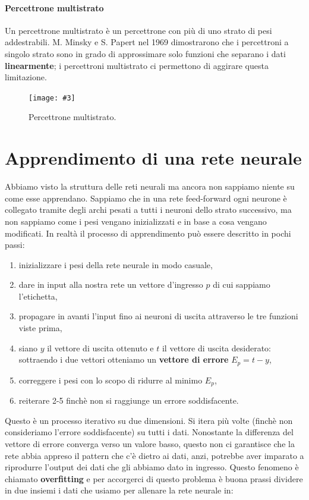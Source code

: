 \documentclass[12pt, twoside, letterpaper]{report}
\newcommand{\img}[4] {
	\begin{figure}
		\centering
		\texttt{[image: \#3]}\\
		\caption{#1}
		\label{fig:#4}
	\end{figure}
}
\begin{document}
			\paragraph{Percettrone multistrato} Un percettrone multistrato è un percettrone con più di uno strato di pesi addestrabili. M. Minsky e S. Papert nel 1969 \cite{minsky_papert} dimostrarono che i percettroni a singolo strato sono in grado di approssimare solo funzioni che separano i dati \textbf{linearmente}; i percettroni multistrato ci permettono di aggirare questa limitazione. 
				\img{Percettrone multistrato. \cite{kriesel}}{0.5}{nn-feed-forward.png}{feedforward}
		
		\section{Apprendimento di una rete neurale}
			Abbiamo visto la struttura delle reti neurali ma ancora non sappiamo niente su come esse apprendano. Sappiamo che in una rete feed-forward ogni neurone è collegato tramite degli archi pesati a tutti i neuroni dello strato successivo, ma non sappiamo come i pesi vengano inizializzati e in base a cosa vengano modificati. In realtà il processo di apprendimento può essere descritto in pochi passi: 
			\begin{enumerate}
				\item inizializzare i pesi della rete neurale in modo casuale,
				\item dare in input alla nostra rete un vettore d'ingresso $p$ di cui sappiamo l'etichetta,
				\item propagare in avanti l'input fino ai neuroni di uscita attraverso le tre funzioni viste prima, 
				\item siano $y$ il vettore di uscita ottenuto e $t$ il vettore di uscita desiderato: sottraendo i due vettori otteniamo un \textbf{vettore di errore} $E_p = t - y$,
				\item correggere i pesi con lo scopo di ridurre al minimo $E_p$,
				\item reiterare 2-5 finchè non si raggiunge un errore soddisfacente.
			\end{enumerate}
			Questo è un processo iterativo su due dimensioni. Si itera più volte (finchè non consideriamo l'errore soddisfacente) su tutti i dati. Nonostante la differenza del vettore di errore converga verso un valore basso, questo non ci garantisce che la rete abbia appreso il pattern che c'è dietro ai dati, anzi, potrebbe aver imparato a riprodurre l'output dei dati che gli abbiamo dato in ingresso. Questo fenomeno è chiamato \textbf{overfitting} e per accorgerci di questo problema è buona prassi dividere in due insiemi i dati che usiamo per allenare la rete neurale in: 
\end{document}
